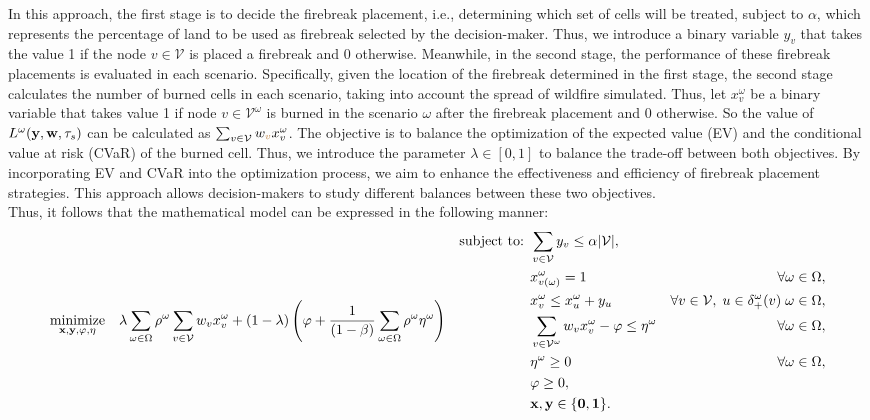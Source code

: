 \documentclass[a4paper,fleqn]{cas-sc}
\begin{document}
In this approach, the first stage is to decide the firebreak placement, i.e., determining which set of cells will be treated, subject to $\alpha$, which represents the percentage of land to be used as firebreak selected by the decision-maker. Thus, we introduce a binary variable $y_v$ that takes the value 1 if the node $v \in \mathcal{V}$ is placed a firebreak and 0 otherwise. Meanwhile, in the second stage, the performance of these firebreak placements is evaluated in each scenario. Specifically, given the location of the firebreak determined in the first stage, the second stage calculates the number of burned cells in each scenario, taking into account the spread of wildfire simulated. Thus, let $x^\omega_v$ be a binary variable that takes value 1 if node $v \in \mathcal{V}^\omega$ is burned in the scenario $\omega$ after the firebreak placement and 0 otherwise. So the value of $L^\omega(\vb{y},\vb{w},\tau_s)$ can be calculated as $\sum_{v \in \mathcal{V}} w_{\textcolor{brown}{v}} x_v^{\omega} $. The objective is to balance the optimization of the expected value (EV) and the conditional value at risk (CVaR) of the burned cell. Thus, we introduce the parameter $\lambda \in [0,1]$ to balance the trade-off between both objectives. By incorporating EV and CVaR into the optimization process, we aim to enhance the effectiveness and efficiency of firebreak placement strategies. This approach allows decision-makers to study different balances between these two objectives.  \\

Thus, it follows that the mathematical model can be expressed in the following manner:
\begin{subequations} \label{m:fpp}
\begin{align}
\underset{\vb{x},\vb{y},\varphi, \vb{\eta}}{\text{minimize}} \quad &  \lambda \sum_{\omega \in \Omega} \rho^\omega \sum_{v \in \mathcal{V}}w_v x_{v}^{\omega}  + (1-\lambda) \left (\varphi + \frac{1}{(1-\beta)} \sum_{\omega \in \Omega} \rho^\omega\eta^\omega \right)& \label{fo:min_expected4}
\end{align}
\begin{align}
    \text{subject to: } 
    & \sum_{v \in \mathcal{V}} y_{v} \leq \alpha \lvert \mathcal{V} \vert,& \label{c:capacity}\\
    & x_{v(\omega)}^{\omega} = 1 & \forall \omega \in \Omega, \label{c:ignition} \\
    & x_{v}^{\omega} \leq x_{u}^{\omega} + y_{u} & \forall v \in \mathcal{V},  \; u \in \delta^{\omega}_+(v) \; \omega \in \Omega, \label{c:spread}\\
    & \sum_{v \in \mathcal{V}^{\omega} }w_v x_v^\omega - \varphi \leq \eta^\omega & \forall \omega \in \Omega, \label{c:cvar_linearization} \\ 
    & \eta^\omega \geq 0 &\forall \omega \in \Omega,  \label{c:eta} \\
    &\varphi \geq 0, & \\    
    & \bf{x}, \bf{y} \in \{0,1\}. \label{c:variables} 
\end{align}
\end{subequations}
\end{document}
